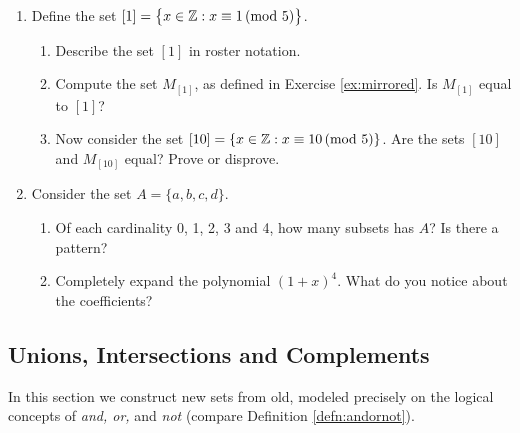 \begin{exercises}{}{}
\begin{enumerate}
  \item Define the set $[1]=\bigl\{x\in\mathbb{Z}: x\equiv 1\negthickspace\pmod{5}\bigr\}$.
		\begin{enumerate}
		  \item Describe the set $[1]$ in roster notation.
		  \item Compute the set $M_{[1]}$, as defined in Exercise \ref{ex:mirrored}. Is $M_{[1]}$ equal to $[1]$?
			\item Now consider the set $[10]=\{x\in\mathbb{Z}:x\equiv 10\negthickspace\pmod{5}\}$. Are the sets $[10]$ and $M_{[10]}$ equal? Prove or disprove.
  	\end{enumerate}


    

		\item Consider the set $A=\{a,b,c,d\}$. 
    \begin{enumerate}
      \item Of each cardinality 0, 1, 2, 3 and 4, how many subsets has $A$? Is there a pattern?
        
      \item Completely expand the polynomial $(1 + x)^4$. What do you notice about the coefficients? 
    \end{enumerate}

	\end{enumerate}
\end{exercises}

\clearpage



\subsection{Unions, Intersections and Complements}\label{sec:union}

In this section we construct new sets from old, modeled precisely on the logical concepts of \emph{and, or,} and \emph{not} (compare Definition \ref{defn:andornot}). 


